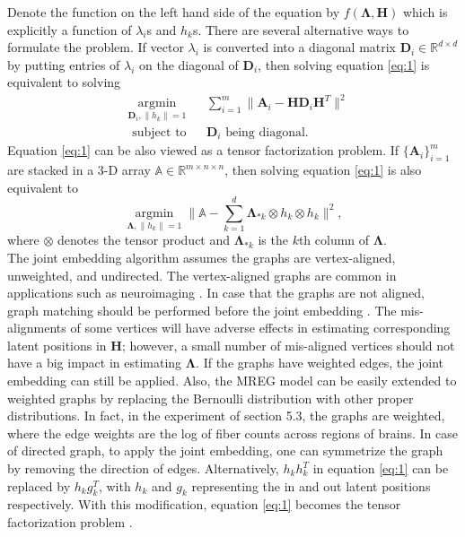 \documentclass[10pt,journal,compsoc]{IEEEtran}
\newcommand{\bA}{\mathbf{A}}
\newcommand{\bH}{\mathbf{H}}
\newcommand{\bD}{\mathbf{D}}
\newcommand{\bLambda}{\mathbf{\Lambda}}
\begin{document}
 Denote the function on the left hand side of the equation by $f(\bLambda,\bH)$ which is explicitly a function of $\lambda_i$s and $h_k$s. There are several alternative ways to formulate the problem. If vector $\lambda_i$ is converted into a diagonal matrix $\bD_i \in \mathbb{R}^{d \times d}$ by putting entries of $\lambda_i$ on the diagonal of $\bD_i$, then solving equation \eqref{eq:1} is equivalent to solving
 \begin{equation*}
\begin{aligned}  
	& \underset{\bD_i,\|h_k\|=1}{\operatorname{argmin}} 
	& & \sum\limits_{i=1}^{m} \| \bA_i- \bH \bD_i \bH^T \|  ^2 \\
	& \text{ subject to} 
	& &  \bD_i \text{ being diagonal.}
\end{aligned}
\end{equation*}
Equation \eqref{eq:1} can be also viewed as a tensor factorization problem. If $\{\bA_i\}_{i=1}^m$ are stacked in a 3-D array ${\mathbb A} \in \mathbb{R}^{m\times n \times n}$, then solving equation \eqref{eq:1} is also equivalent to
\[  \underset{\bLambda,\|h_k\|=1}{\operatorname{argmin}}  \| {\mathbb A} - \sum\limits_{k=1}^{d} \bLambda_{*k} \otimes h_k \otimes h_k\|  ^2,  \]
where $\otimes$ denotes the tensor product and $\bLambda_{*k}$ is the $k$th column of $\bLambda$. \\

\noindent The joint embedding algorithm assumes the graphs are vertex-aligned, unweighted, and undirected. The vertex-aligned graphs are common in applications such as neuroimaging \cite{nolte2002human}. In case that the graphs are not aligned, graph matching should be performed before the joint embedding \cite{yan2014graduated,park2016encouraging}. The mis-alignments of some vertices will have adverse effects in estimating corresponding latent positions in $\bH$; however, a small number of mis-aligned vertices should not have a big impact in estimating $\bLambda$. If the graphs have weighted edges, the joint embedding can still be applied. Also, the MREG model can be easily extended to weighted graphs by replacing the Bernoulli distribution with other proper distributions. In fact, in the experiment of section 5.3, the graphs are weighted, where the edge weights are the log of fiber counts across regions of brains. In case of directed graph, to apply the joint embedding, one can symmetrize the graph by removing the direction of edges. Alternatively, $h_k h_k^T$ in equation \eqref{eq:1} can be replaced by $h_k g_k^T$, with  $h_k$ and $g_k$ representing the in and out latent positions respectively. With this modification, equation \eqref{eq:1} becomes the tensor factorization problem \cite{kolda2009tensor}.\\
\end{document}

